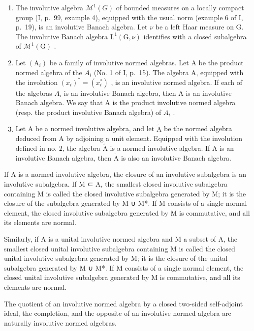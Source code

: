 \begin{enumerate}
\def\labelenumi{\arabic{enumi})}
\setcounter{enumi}{3}
\item
  The involutive algebra \(\mathcal{M}^{1}(G)\) of bounded measures on a locally compact group (I, p.~99, example 4), equipped with the usual norm (example 6 of I, p.~19), is an involutive Banach algebra. Let \(\nu\) be a left Haar measure on G. The involutive Banach algebra \(\mathrm{L}^{1}(\mathrm{G},\nu)\) identifies with a closed subalgebra of \(\mathcal{M}^{1}(\mathrm{G})\) .
\item
  Let \((\mathrm{A}_{i})\) be a family of involutive normed algebras. Let A be the product normed algebra of the \(A_{i}\) (No. 1 of I, p.~15). The algebra A, equipped with the involution \((x_{i})^{*} = (x_{i}^{*})\) , is an involutive normed algebra. If each of the algebras \(A_{i}\) is an involutive Banach algebra, then A is an involutive Banach algebra. We say that A is the product involutive normed algebra (resp. the product involutive Banach algebra) of \(A_{i}\) .
\item
  Let A be a normed involutive algebra, and let \(\widetilde{\mathrm{A}}\) be the normed algebra deduced from A by adjoining a unit element. Equipped with the involution defined in no. 2, the algebra \(\widetilde{\mathrm{A}}\) is a normed involutive algebra. If A is an involutive Banach algebra, then \(\widetilde{\mathrm{A}}\) is also an involutive Banach algebra.
\end{enumerate}

If A is a normed involutive algebra, the closure of an involutive subalgebra is an involutive subalgebra. If M ⊂ A, the smallest closed involutive subalgebra containing M is called the closed involutive subalgebra generated by M; it is the closure of the subalgebra generated by M ∪ M*. If M consists of a single normal element, the closed involutive subalgebra generated by M is commutative, and all its elements are normal.

Similarly, if A is a unital involutive normed algebra and M a subset of A, the smallest closed unital involutive subalgebra containing M is called the closed unital involutive subalgebra generated by M; it is the closure of the unital subalgebra generated by M ∪ M*. If M consists of a single normal element, the closed unital involutive subalgebra generated by M is commutative, and all its elements are normal.

The quotient of an involutive normed algebra by a closed two-sided self-adjoint ideal, the completion, and the opposite of an involutive normed algebra are naturally involutive normed algebras.

